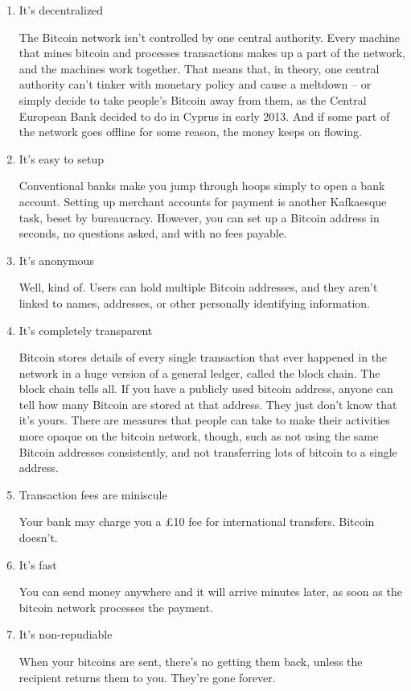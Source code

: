 \begin{enumerate}
	\item It’s decentralized
	
	The Bitcoin network isn’t controlled by one central authority. Every machine that mines bitcoin and
	processes transactions makes up a part of the network, and the machines work together. That means that, 
	in theory, one central authority can’t tinker with monetary policy and cause a meltdown – or simply 
	decide to take people’s Bitcoin away from them, as the Central European Bank decided to do in Cyprus in 
	early 2013. And if some part of the network goes offline for some reason, the money keeps on flowing.
	\item It's easy to setup

	Conventional banks make you jump through hoops simply to open a bank account. Setting up merchant
	accounts for payment is another Kafkaesque task, beset by bureaucracy. However, you can set up a
	Bitcoin address in seconds, no questions asked, and with no fees payable.

	\item It's anonymous

	Well, kind of. Users can hold multiple Bitcoin addresses, and they aren’t linked to names, addresses, or
	other personally identifying information.

	\item It's completely transparent

	Bitcoin stores details of every single transaction that ever happened in the network in a huge version 
	of a general ledger, called the block chain. The block chain tells all. If you have a publicly used bitcoin
	address, anyone can tell how many Bitcoin are stored at that address. They just don’t know that it’s yours.
	There are measures that people can take to make their activities more opaque on the bitcoin network,
	though, such as not using the same Bitcoin addresses consistently, and not transferring lots of bitcoin to a
	single address.

	\item Transaction fees are miniscule

	Your bank may charge you a £10 fee for international transfers. Bitcoin doesn’t.

	\item It's fast

	You can send money anywhere and it will arrive minutes later, as soon as the bitcoin network processes
	the payment.

	\item It's non-repudiable

	When your bitcoins are sent, there’s no getting them back, unless the recipient returns them to you.
	They’re gone forever.
\end{enumerate}



